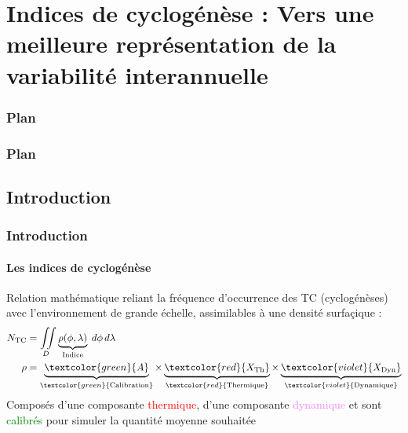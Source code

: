 \documentclass[aspectratio=169, usepdftitle=false, xcolor={dvipsnames}, 9pt,table]{beamer}
\begin{document}
\section[Indices de cyclogénèse]{Indices de cyclogénèse : Vers une meilleure représentation de la variabilité interannuelle}
\begin{frame}[c]
    \frametitle{Plan}
    \addtocounter{framesinsection}{-1}
    \tableofcontents[currentsection,hideallsubsections,sections={1-3}]
    \vspace{-3em}
    \tableofcontents[hideallsubsections,sections={4-}]
\end{frame}
%
\begin{frame}[c]
    \frametitle{Plan}
    \addtocounter{framesinsection}{-1}
\end{frame}

\makesecslide

\subsection{Introduction}
\begin{frame}[t]
    \frametitle{Introduction}
    \framesubtitle{Les indices de cyclogénèse}
    \small
    \begin{definition}[Définition]
        Relation mathématique reliant la fréquence d'occurrence des TC (cyclogénèses) avec l'environnement de grande échelle, assimilables à une densité
        surfaçique :
        \begin{align*}
            N_{\text{TC}} &= \iint\limits_{D} \underbrace{\rho(\phi, \lambda)}_{\text{Indice}} \; d\phi \, d\lambda \\
            \rho &= \underbrace{\vphantom{X_{\text{Dyn}}}\textcolor{green}{A}}_{\textcolor{green}{\text{Calibration}}} \times
            \underbrace{\vphantom{X_{\text{Dyn}}}\textcolor{red}{X_{\text{Th}}}}_{\textcolor{red}{\text{Thermique}}} \times
            \underbrace{\textcolor{violet}{X_{\text{Dyn}}}}_{\textcolor{violet}{\text{Dynamique}}}
        \end{align*}
        Composés d'une composante \textcolor{red}{thermique}, d'une composante \textcolor{violet}{dynamique} et sont \textcolor{green}{calibrés} pour simuler la
        quantité moyenne souhaitée 
    \end{definition}
    \vspace{1em}
\end{frame}
\end{document}
